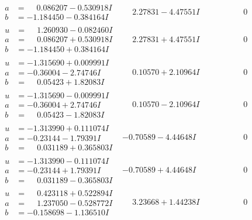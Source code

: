\documentclass[1p]{elsarticle_modified}
\theoremstyle{definition}
\begin{document}
$$\begin{array}{c|c|c}
\begin{aligned}
a &= \phantom{-}0.086207 - 0.530918 I \\
b &= -1.184450 - 0.384164 I\end{aligned}
 & \phantom{-}2.27831 - 4.47551 I & \phantom{-0.000000 } 0 \\ \hline\begin{aligned}
u &= \phantom{-}1.260930 - 0.082460 I \\
a &= \phantom{-}0.086207 + 0.530918 I \\
b &= -1.184450 + 0.384164 I\end{aligned}
 & \phantom{-}2.27831 + 4.47551 I & \phantom{-0.000000 } 0 \\ \hline\begin{aligned}
u &= -1.315690 + 0.009991 I \\
a &= -0.36004 - 2.74746 I \\
b &= \phantom{-}0.05423 + 1.82083 I\end{aligned}
 & \phantom{-}0.10570 + 2.10964 I & \phantom{-0.000000 } 0 \\ \hline\begin{aligned}
u &= -1.315690 - 0.009991 I \\
a &= -0.36004 + 2.74746 I \\
b &= \phantom{-}0.05423 - 1.82083 I\end{aligned}
 & \phantom{-}0.10570 - 2.10964 I & \phantom{-0.000000 } 0 \\ \hline\begin{aligned}
u &= -1.313990 + 0.111074 I \\
a &= -0.23144 - 1.79391 I \\
b &= \phantom{-}0.031189 + 0.365803 I\end{aligned}
 & -0.70589 - 4.44648 I & \phantom{-0.000000 } 0 \\ \hline\begin{aligned}
u &= -1.313990 - 0.111074 I \\
a &= -0.23144 + 1.79391 I \\
b &= \phantom{-}0.031189 - 0.365803 I\end{aligned}
 & -0.70589 + 4.44648 I & \phantom{-0.000000 } 0 \\ \hline\begin{aligned}
u &= \phantom{-}0.423118 + 0.522894 I \\
a &= \phantom{-}1.237050 - 0.528772 I \\
b &= -0.158698 - 1.136510 I\end{aligned}
 & \phantom{-}3.23668 + 1.44238 I & \phantom{-0.000000 } 0\\

\end{array}$$
\end{document}
